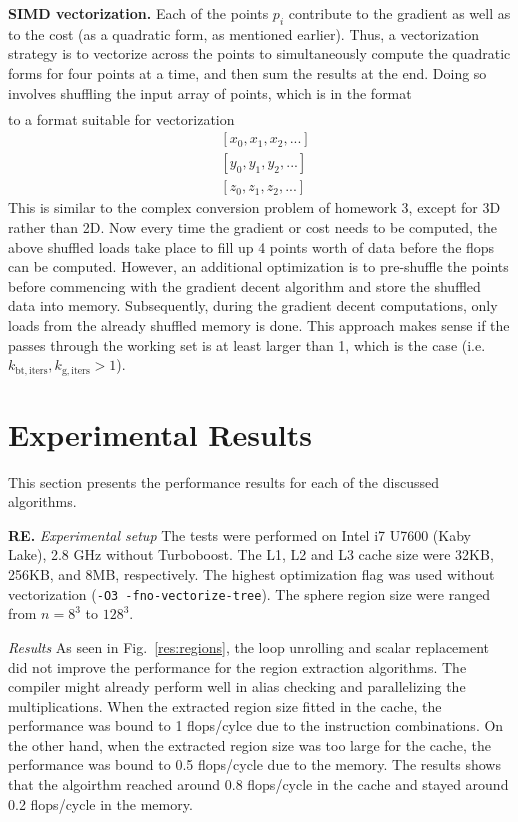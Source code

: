\documentclass[letterpaper]{article}
\newcommand{\mypar}[1]{{\bf #1.}}
\begin{document}
\mypar{SIMD vectorization}
Each of the points $p_i$ contribute to the gradient as well as to the cost (as a quadratic form, as mentioned earlier). Thus, a vectorization strategy is to vectorize across the points to simultaneously compute the quadratic forms for four points at a time, and then sum the results at the end. Doing so involves shuffling the input array of points, which is in the format 
\begin{align}
  [x_0, y_0, z_0, x_1, y_1, z_1, x_2, y_2, ...]
\end{align}
to a format suitable for vectorization
\begin{align}
  &[x_0, x_1, x_2, ...] \\
  &[y_0, y_1, y_2, ...] \\
  &[z_0, z_1, z_2, ...]
\end{align}
This is similar to the complex conversion problem of homework 3, except for 3D rather than 2D. Now every time the gradient or cost needs to be computed, the above shuffled loads take place to fill up 4 points worth of data before the flops can be computed. However, an additional optimization is to pre-shuffle the points before commencing with the gradient decent algorithm and store the shuffled data into memory. Subsequently, during the gradient decent computations, only loads from the already shuffled memory is done. This approach makes sense if the passes through the working set is at least larger than 1, which is the case (i.e. $k_\mathrm{bt,iters}, k_\mathrm{g,iters} > 1$). 

\section{Experimental Results}\label{sec:exp}
This section presents the performance results for each of the discussed algorithms.

\mypar{RE} \textit{Experimental setup} The tests were performed on Intel i7 U7600 (Kaby Lake), 2.8 GHz without Turboboost. The L1, L2 and L3 cache size were 32KB, 256KB, and 8MB, respectively. The highest optimization flag was used without vectorization (\texttt{-O3 -fno-vectorize-tree}). The sphere region size were ranged from $n=8^{3}$ to $128^{3}$.

\textit{Results} As seen in Fig.~\ref{res:regions}, the loop unrolling and scalar replacement did not improve the performance for the region extraction algorithms. The compiler might already perform well in alias checking and parallelizing the multiplications. When the extracted region size fitted in the cache, the performance was bound to 1 flops/cylce due to the instruction combinations. On the other hand, when the extracted region size was too large for the cache, the performance was bound to 0.5 flops/cycle due to the memory. The results shows that the algoirthm reached around 0.8 flops/cycle in the cache and stayed around 0.2 flops/cycle in the memory.
   
\end{document}
